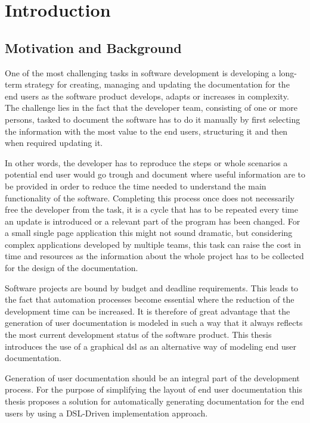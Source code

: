 \chapter{Introduction}
\section{Motivation and Background}
One of the most challenging tasks in software development is developing a long-term strategy for creating, managing and updating the documentation for the end users as the software product develops, adapts or increases in complexity. The challenge lies in the fact that the developer team, consisting of one or more persons, tasked to document the software has to do it manually by first selecting the information with the most value to the end users, structuring it and then when required updating it.

In other words, the developer has to reproduce the steps or whole scenarios a potential end user would go trough and document where useful information are to be provided in order to reduce the time needed to understand the main functionality of the software. Completing this process once does not necessarily free the developer from the task, it is a cycle that has to be repeated every time an update is introduced or a relevant part of the program has been changed. For a small single page application this might not sound dramatic, but considering complex applications developed by multiple teams, this task can raise the cost in time and resources as the information about the whole project has to be collected for the design of the documentation\cite{5712775}.

Software projects are bound by budget and deadline requirements. This leads to the fact that automation processes become essential where the reduction of the development time can be increased. It is therefore of great advantage that the generation of user documentation is modeled in such a way that it always reflects the most current development status of the software product. This thesis introduces the use of a graphical \acrfull{dsl} as an alternative way of modeling end user documentation.

Generation of user documentation should be an integral part of the development process. For the purpose of simplifying the layout of end user documentation this thesis proposes a solution for automatically generating documentation for the end users by using a DSL-Driven implementation approach.

